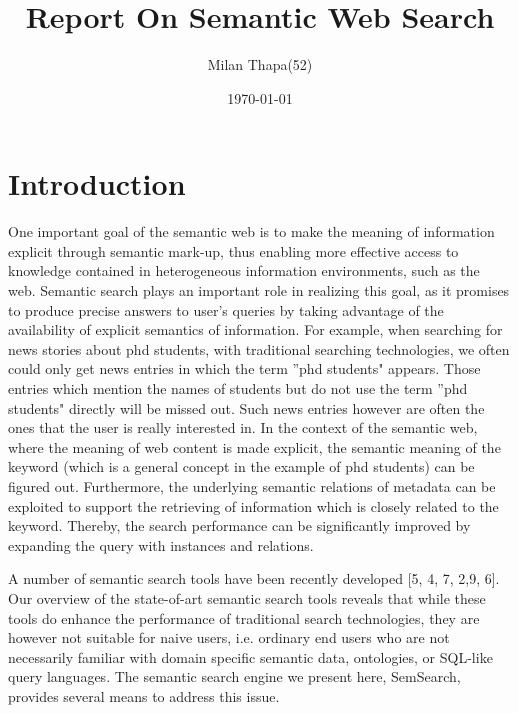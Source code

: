 \documentclass[titlepage]{report}
\begin{document}
\title{Report On Semantic Web Search}
\author{Milan Thapa(52)}
\date{\today}
\maketitle
{}
\setcounter{page}{2}
\tableofcontents
\newpage
\section{Introduction}
One important goal of the semantic web is to make the meaning of information explicit through semantic mark-up, thus enabling more effective access to knowledge contained in heterogeneous information environments, such as the web. Semantic search plays an important role in realizing this goal, as it promises to produce precise answers to user’s queries by taking advantage of the availability of explicit semantics of information. For example, when searching for news stories about phd students, with traditional searching technologies, we often could only get news entries in which the term ''phd students" appears. Those entries which mention the names of students but do not use the term ''phd students" directly will be missed out. Such news entries however are often the ones that the user is really interested in. In the context of the semantic web, where the meaning of web content is made explicit, the semantic meaning of the keyword (which is a general concept in the example of phd students) can be figured out. Furthermore, the underlying semantic relations of metadata can be exploited to support the retrieving of information which is closely related to the keyword. Thereby, the search performance can be significantly improved by expanding the query with instances and relations.


A number of semantic search tools have been recently developed [5, 4, 7, 2,9, 6]. Our overview of the state-of-art semantic search tools reveals that while these tools do enhance the performance of traditional search technologies, they are however not suitable for naive users, i.e. ordinary end users who are not necessarily familiar with domain specific semantic data, ontologies, or SQL-like query languages. The semantic search engine we present here, SemSearch, provides several means to address this issue.
\end{document}
